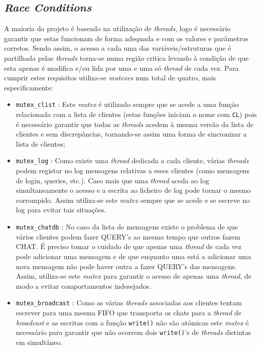 \documentclass[a4paper]{article}
\begin{document}
	\subsection{\textit{Race Conditions}}

	A maioria do projeto é baseado na utilização de \textit{threads}, logo é necessário garantir que estas funcionam de forma adequada e com os valores e parâmetros corretos. Sendo assim, o acesso a cada uma das variáveis/estruturas que é partilhada pelas \textit{threads} torna-se numa região critica levando à condição de que esta apenas é modifica e/ou lida por uma e uma só \textit{thread} de cada vez. Para cumprir estes requisitos utiliza-se \textit{mutexes} num total de quatro, mais especificamente: 

	\begin{itemize}
		\item \texttt{mutex\_clist} : Este \textit{mutex} é utilizado sempre que se acede a uma função relacionada com a lista de clientes (estas funções iniciam o nome com \texttt{CL}) pois é necessário garantir que todas as \textit{threads} acedem à mesma versão da lista de clientes e sem discrepâncias, tornando-se assim uma forma de sincronizar a lista de clientes;  
		\item \texttt{mutex\_log} : Como existe uma \textit{thread} dedicada a cada cliente, várias \textit{threads} podem registar no log mensagens relativas a esses clientes (como mensagens de login, queries, etc.). Caso mais que uma \textit{thread} aceda ao log simultaneamente o acesso e a escrita ao ficheiro de log pode tornar o mesmo corrompido. Assim utiliza-se este \textit{mutex} sempre que se acede e se escreve no log para evitar tais situações. 
		\item \texttt{mutex\_chatdb} : No caso da lista de mensagens existe o problema de que vários clientes podem fazer QUERY's ao mesmo tempo que outros fazem CHAT. É preciso tomar o cuidado de que apenas uma \textit{thread} de cada vez pode adicionar uma mensagem e de que enquanto uma está a adicionar uma nova mensagem não pode haver outra a fazer QUERY's das mensagens. Assim, utiliza-se este \textit{mutex} para garantir o acesso de apenas uma \textit{thread}, de modo a evitar comportamentos indesejados.
        \item \texttt{mutex\_broadcast} : Como as várias \textit{threads} associadas aos clientes tentam escrever para uma mesma FIFO que transporta os chats para a \textit{thread} de \textit{broadcast} e as escritas com a função \texttt{write()} não são atómicas este \textit{mutex} é necessário para garantir que não ocorrem dois \texttt{write()}'s de \textit{threads} distintas em simultâneo.
	\end{itemize}
\end{document}
